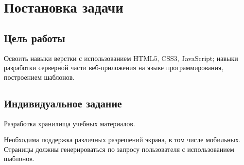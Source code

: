 \section{Постановка задачи}
\subsection{Цель работы}

Освоить навыки верстки с использованием HTML5, CSS3, JavaScript; навыки разработки серверной части веб-приложения на языке программирования, построением шаблонов.

\subsection{Индивидуальное  задание}

Разработка хранилища учебных материалов.

Необходима поддержка различных разрешений экрана, в том числе мобильных. Страницы должны генерироваться по запросу пользователя с использованием шаблонов.